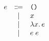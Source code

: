 \documentclass[12pt]{article}
\begin{document}
\pagestyle{empty}

\begin{align*}
    \begin{array}{rcl}
        e
        &\Coloneqq & \text{\texttt{()}} \\
        &\mid & x \\
        &\mid & \lambda x\ldotp e \\
        &\mid & e\; e
    \end{array}
\end{align*}
\end{document}
